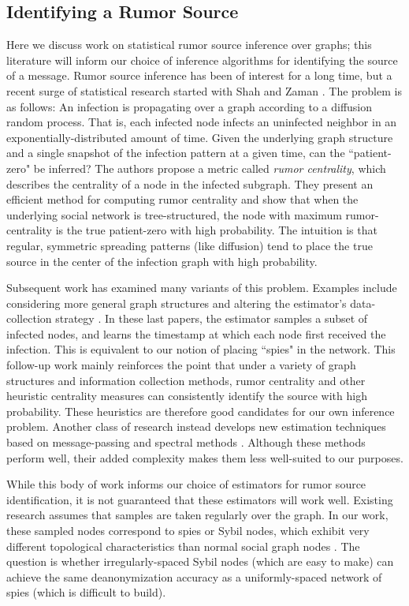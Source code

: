 \documentclass[10pt, twocolumn]{article}
\begin{document}
\subsection{Identifying a Rumor Source}
Here we discuss work on statistical rumor source inference over graphs; this literature will inform our choice of inference algorithms for identifying the source of a message.
Rumor source inference has been of interest for a long time, but a recent surge of statistical research started with Shah and Zaman \cite{shah2011rumors}. The problem is as follows: An infection is propagating over a graph according to a diffusion random process. 
That is, each infected node infects an uninfected neighbor in an exponentially-distributed amount of time.
Given the underlying graph structure and a single snapshot of the infection pattern at a given time, can the ``patient-zero" be inferred?
The authors propose a metric called \emph{rumor centrality}, which describes the centrality of a node in the infected subgraph.
They present an efficient method for computing rumor centrality and show that when the underlying social network is tree-structured, the node with maximum rumor-centrality is the true patient-zero with high probability. The intuition is that regular, symmetric spreading patterns (like diffusion) tend to place the true source in the center of the infection graph with high probability. 

Subsequent work has examined many variants of this problem. Examples include considering more general graph structures \cite{shah2012rumor} and altering the estimator's data-collection strategy \cite{pinto,karamchandani2013rumor,luo2013identify}.
In these last papers, the estimator samples a subset of infected nodes, and learns the timestamp at which each node first received the infection. 
This is equivalent to our notion of placing ``spies" in the network. 
This follow-up work mainly reinforces the point that under a variety of graph structures and information collection methods, rumor centrality and other heuristic centrality measures can consistently identify the source with high probability. 
These heuristics are therefore good candidates for our own inference problem. 
Another class of research instead develops new estimation techniques based on message-passing \cite{lokhov2014inferring} and spectral methods \cite{fioriti2012predicting}.
Although these methods perform well, their added complexity makes them less well-suited to our purposes.

While this body of work informs our choice of estimators for rumor source identification, it is not guaranteed that these estimators will work well. 
Existing research assumes that samples are taken regularly over the graph. 
In our work, these sampled nodes correspond to spies or Sybil nodes, which exhibit very different topological characteristics than normal social graph nodes \cite{narayanan2009anonymizing}.
The question is whether irregularly-spaced Sybil nodes (which are easy to make) can achieve the same deanonymization accuracy as a uniformly-spaced network of spies (which is difficult to build).
\end{document}
